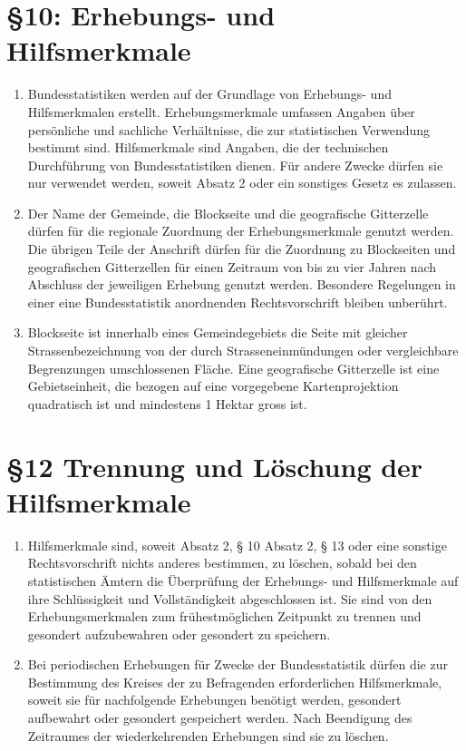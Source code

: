 \documentclass[A4, 12pt]{scrbook}
\begin{document}
    \section{\S 10: Erhebungs- und Hilfsmerkmale}
        \begin{enumerate}[label=(\arabic*)]
            \item Bundesstatistiken werden auf der Grundlage von Erhebungs- und Hilfsmerkmalen erstellt. Erhebungsmerkmale umfassen Angaben über persönliche und sachliche Verhältnisse, die zur statistischen Verwendung bestimmt sind. Hilfsmerkmale sind Angaben, die der technischen Durchführung von Bundesstatistiken dienen. Für andere Zwecke dürfen sie nur verwendet werden, soweit Absatz 2 oder ein sonstiges Gesetz es zulassen.
            \item Der Name der Gemeinde, die Blockseite und die geografische Gitterzelle dürfen für die regionale Zuordnung der Erhebungsmerkmale genutzt werden. Die übrigen Teile der Anschrift dürfen für die Zuordnung zu Blockseiten und geografischen Gitterzellen für einen Zeitraum von bis zu vier Jahren nach Abschluss der jeweiligen Erhebung genutzt werden. Besondere Regelungen in einer eine Bundesstatistik anordnenden Rechtsvorschrift bleiben unberührt.
            \item Blockseite ist innerhalb eines Gemeindegebiets die Seite mit gleicher Strassenbezeichnung von der durch Strasseneinmündungen oder vergleichbare Begrenzungen umschlossenen Fläche. Eine geografische Gitterzelle ist eine Gebietseinheit, die bezogen auf eine vorgegebene Kartenprojektion quadratisch ist und mindestens 1 Hektar gross ist.
        \end{enumerate}
    \section{\S 12 Trennung und Löschung der Hilfsmerkmale}
        \begin{enumerate}[label=(\arabic*)]
            \item Hilfsmerkmale sind, soweit Absatz 2, § 10 Absatz 2, § 13 oder eine sonstige Rechtsvorschrift nichts anderes bestimmen, zu löschen, sobald bei den statistischen Ämtern die Überprüfung der Erhebungs- und Hilfsmerkmale auf ihre Schlüssigkeit und Vollständigkeit abgeschlossen ist. Sie sind von den Erhebungsmerkmalen zum frühestmöglichen Zeitpunkt zu trennen und gesondert aufzubewahren oder gesondert zu speichern.
            \item Bei periodischen Erhebungen für Zwecke der Bundesstatistik dürfen die zur Bestimmung des Kreises der zu Befragenden erforderlichen Hilfsmerkmale, soweit sie für nachfolgende Erhebungen benötigt werden, gesondert aufbewahrt oder gesondert gespeichert werden. Nach Beendigung des Zeitraumes der wiederkehrenden Erhebungen sind sie zu löschen.
        \end{enumerate}
\end{document}
